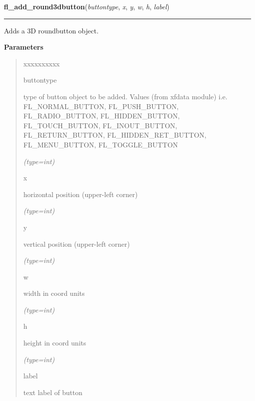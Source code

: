 \hspace{.8\funcindent}\begin{boxedminipage}{\funcwidth}

    \raggedright \textbf{fl\_add\_round3dbutton}(\textit{buttontype}, \textit{x}, \textit{y}, \textit{w}, \textit{h}, \textit{label})

    \vspace{-1.5ex}

    \rule{\textwidth}{0.5\fboxrule}
\setlength{\parskip}{2ex}
    Adds a 3D roundbutton object.

\setlength{\parskip}{1ex}
      \textbf{Parameters}
      \vspace{-1ex}

      \begin{quote}
        \begin{Ventry}{xxxxxxxxxx}

          \item[buttontype]

          type of button object to be added. Values (from xfdata module) 
          i.e. FL\_NORMAL\_BUTTON, FL\_PUSH\_BUTTON, FL\_RADIO\_BUTTON, 
          FL\_HIDDEN\_BUTTON, FL\_TOUCH\_BUTTON, FL\_INOUT\_BUTTON, 
          FL\_RETURN\_BUTTON, FL\_HIDDEN\_RET\_BUTTON, FL\_MENU\_BUTTON, 
          FL\_TOGGLE\_BUTTON

            {\it (type=int)}

          \item[x]

          horizontal position (upper-left corner)

            {\it (type=int)}

          \item[y]

          vertical position (upper-left corner)

            {\it (type=int)}

          \item[w]

          width in coord units

            {\it (type=int)}

          \item[h]

          height in coord units

            {\it (type=int)}

          \item[label]

          text label of button


\end{Ventry}
\end{quote}
\end{boxedminipage}
